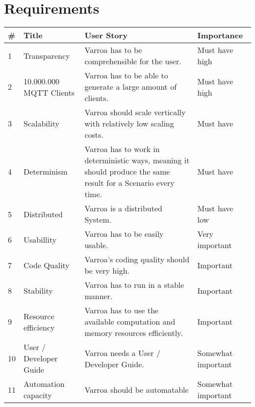 \section{Requirements}
\begin{table}
	\begin{tabular}{| l | l | p{5cm} | l |}
		\hline
		\rowcolor{Gray}
		\# & Title & User Story & Importance \\
		\hline
		1 & Transparency & Varroa has to be comprehensible for the user. & Must have high \\
		\hline
		2 & 10.000.000 MQTT Clients & Varroa has to be able to generate a large amount of clients. & Must have high \\
		\hline
		3 & Scalability & Varroa should scale vertically with relatively low scaling costs. & Must have \\
		\hline
		4 & Determinism & Varroa has to work in deterministic ways, meaning it should produce the same result for a Scenario every time. & Must have \\
		\hline
		5 & Distributed & Varroa is a distributed System. & Must have low \\
		\hline
		6 & Usabillity & Varroa has to be easily usable. & Very important \\
		\hline
		7 & Code Quality & Varroa's coding quality should be very high. & Important\\
		\hline
		8 & Stability & Varroa has to run in a stable manner. & Important \\
		\hline
		9 & Resource efficiency & Varroa has to use the available computation and memory resources efficiently. & Important\\
		\hline
		10 & User / Developer Guide & Varroa needs a User / Developer Guide. & Somewhat important \\
		\hline
		11 & Automation capacity & Varroa should be automatable & Somewhat important \\
		\hline
	\end{tabular}
\end{table}